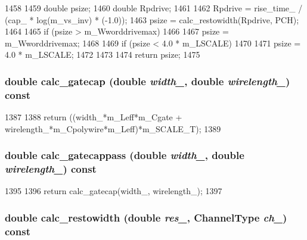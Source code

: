\begin{DoxyCode}
1458 {
1459     double psize;
1460     double Rpdrive;
1461 
1462     Rpdrive = rise_time_ / (cap_ * log(m_vs_inv) * (-1.0));
1463     psize = calc_restowidth(Rpdrive, PCH);
1464 
1465     if (psize > m_Wworddrivemax)
1466     {
1467         psize = m_Wworddrivemax;
1468     }
1469     if (psize < 4.0 * m_LSCALE)
1470     {
1471         psize = 4.0 * m_LSCALE;
1472     }
1473 
1474     return psize;
1475 }
\end{DoxyCode}
\hypertarget{classTechParameter_a4011376f02f1fd5a8d32797893389f68}{
\subsubsection[{calc\_\-gatecap}]{\setlength{\rightskip}{0pt plus 5cm}double calc\_\-gatecap (double {\em width\_\-}, \/  double {\em wirelength\_\-}) const}}
\label{classTechParameter_a4011376f02f1fd5a8d32797893389f68}



\begin{DoxyCode}
1387 {
1388     return ((width_*m_Leff*m_Cgate + wirelength_*m_Cpolywire*m_Leff)*m_SCALE_T);
1389 }
\end{DoxyCode}
\hypertarget{classTechParameter_a581268b9e7f5d1345f4bf9b3c3d97ce7}{
\subsubsection[{calc\_\-gatecappass}]{\setlength{\rightskip}{0pt plus 5cm}double calc\_\-gatecappass (double {\em width\_\-}, \/  double {\em wirelength\_\-}) const}}
\label{classTechParameter_a581268b9e7f5d1345f4bf9b3c3d97ce7}



\begin{DoxyCode}
1395 {
1396     return calc_gatecap(width_, wirelength_);
1397 }
\end{DoxyCode}
\hypertarget{classTechParameter_aa0e13430521f01f76cd850c20a163683}{
\subsubsection[{calc\_\-restowidth}]{\setlength{\rightskip}{0pt plus 5cm}double calc\_\-restowidth (double {\em res\_\-}, \/  {\bf ChannelType} {\em ch\_\-}) const}}
\label{classTechParameter_aa0e13430521f01f76cd850c20a163683}



